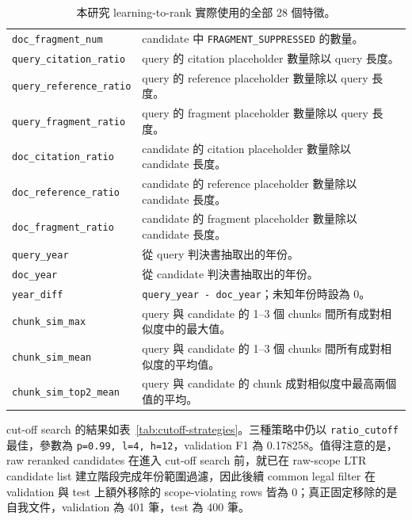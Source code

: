\begin{table}[t]
\begin{tabular}{lp{}}
    \texttt{doc\_fragment\_num} & candidate 中 \texttt{FRAGMENT\_SUPPRESSED} 的數量。 \\
    \texttt{query\_citation\_ratio} & query 的 citation placeholder 數量除以 query 長度。 \\
    \texttt{query\_reference\_ratio} & query 的 reference placeholder 數量除以 query 長度。 \\
    \texttt{query\_fragment\_ratio} & query 的 fragment placeholder 數量除以 query 長度。 \\
    \texttt{doc\_citation\_ratio} & candidate 的 citation placeholder 數量除以 candidate 長度。 \\
    \texttt{doc\_reference\_ratio} & candidate 的 reference placeholder 數量除以 candidate 長度。 \\
    \texttt{doc\_fragment\_ratio} & candidate 的 fragment placeholder 數量除以 candidate 長度。 \\
    \texttt{query\_year} & 從 query 判決書抽取出的年份。 \\
    \texttt{doc\_year} & 從 candidate 判決書抽取出的年份。 \\
    \texttt{year\_diff} & \texttt{query\_year - doc\_year}；未知年份時設為 0。 \\
    \texttt{chunk\_sim\_max} & query 與 candidate 的 1--3 個 chunks 間所有成對相似度中的最大值。 \\
    \texttt{chunk\_sim\_mean} & query 與 candidate 的 1--3 個 chunks 間所有成對相似度的平均值。 \\
    \texttt{chunk\_sim\_top2\_mean} & query 與 candidate 的 chunk 成對相似度中最高兩個值的平均。 \\
    \bottomrule
  \end{tabular}
  \caption{本研究 learning-to-rank 實際使用的全部 28 個特徵。}
  \label{tab:ltr-features}
\end{table}

cut-off search 的結果如表~\ref{tab:cutoff-strategies}。三種策略中仍以 \texttt{ratio\_cutoff} 最佳，參數為 \texttt{p=0.99, l=4, h=12}，validation F1 為 0.178258。值得注意的是，raw reranked candidates 在進入 cut-off search 前，就已在 raw-scope LTR candidate list 建立階段完成年份範圍過濾，因此後續 common legal filter 在 validation 與 test 上額外移除的 scope-violating rows 皆為 0；真正固定移除的是自我文件，validation 為 401 筆，test 為 400 筆。

